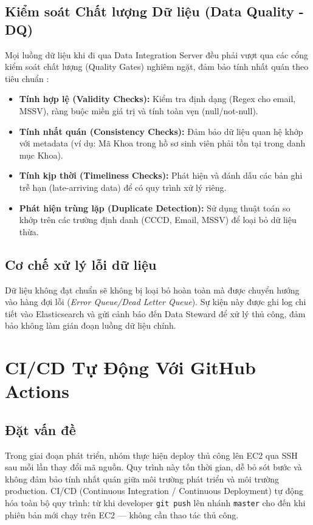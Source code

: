 \subsection{Kiểm soát Chất lượng Dữ liệu (Data Quality - DQ)}

Mọi luồng dữ liệu khi đi qua Data Integration Server đều phải vượt qua các cổng kiểm soát chất lượng (Quality Gates) nghiêm ngặt, đảm bảo tính nhất quán theo tiêu chuẩn \cite{gartner:data_consistency}:

\begin{itemize}
    \item \textbf{Tính hợp lệ (Validity Checks):} Kiểm tra định dạng (Regex cho email, MSSV), ràng buộc miền giá trị và tính toàn vẹn (null/not-null).
    \item \textbf{Tính nhất quán (Consistency Checks):} Đảm bảo dữ liệu quan hệ khớp với metadata (ví dụ: Mã Khoa trong hồ sơ sinh viên phải tồn tại trong danh mục Khoa).
    \item \textbf{Tính kịp thời (Timeliness Checks):} Phát hiện và đánh dấu các bản ghi trễ hạn (late-arriving data) để có quy trình xử lý riêng.
    \item \textbf{Phát hiện trùng lặp (Duplicate Detection):} Sử dụng thuật toán so khớp trên các trường định danh (CCCD, Email, MSSV) để loại bỏ dữ liệu thừa.
\end{itemize}

\subsection{Cơ chế xử lý lỗi dữ liệu}

Dữ liệu không đạt chuẩn sẽ không bị loại bỏ hoàn toàn mà được chuyển hướng vào hàng đợi lỗi (\textit{Error Queue/Dead Letter Queue}). Sự kiện này được ghi log chi tiết vào Elasticsearch và gửi cảnh báo đến Data Steward để xử lý thủ công, đảm bảo không làm gián đoạn luồng dữ liệu chính.

\section{CI/CD Tự Động Với GitHub Actions}
\label{sec:cicd-github}

\subsection{Đặt vấn đề}

Trong giai đoạn phát triển, nhóm thực hiện deploy thủ công lên EC2 qua SSH
sau mỗi lần thay đổi mã nguồn. Quy trình này tốn thời gian, dễ bỏ sót bước
và không đảm bảo tính nhất quán giữa môi trường phát triển và môi trường
production. CI/CD (Continuous Integration / Continuous Deployment) tự động
hóa toàn bộ quy trình: từ khi developer \texttt{git push} lên nhánh
\texttt{master} cho đến khi phiên bản mới chạy trên EC2 --- không cần thao
tác thủ công.

